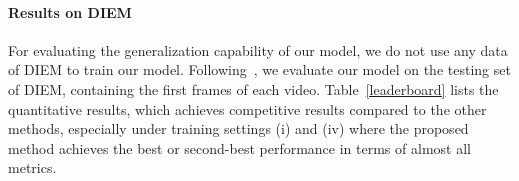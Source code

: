 \documentclass[review]{elsarticle}
\begin{document}
\paragraph{Results on DIEM} For evaluating the generalization capability of our model, we do not use any data of DIEM to train our model.
Following~\cite{hossein2015many, lai2019video}, we evaluate our model on the testing set of DIEM, containing the first  frames of each video.
Table~\ref{leaderboard} lists the quantitative results, which achieves competitive results compared to the other methods, especially under training settings (i) and (iv) where the proposed method achieves the best or second-best performance in terms of almost all metrics.


\renewcommand\arraystretch{0.7}
\begin{table*}[t]
\caption{Results of ablative experiments of the proposed model on the UCF sports testing set. The best scores are marked in \textbf{bold}. The symbol '\textit{w/o.}' denotes removing a specific module.}\smallskip
\centering
{}
\label{ablation}
\end{table*}
\end{document}

